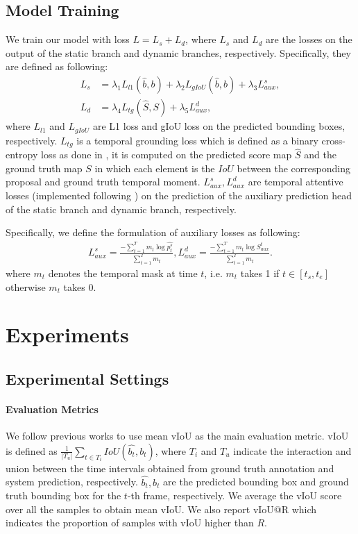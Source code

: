 \documentclass[sigconf]{acmart}
\begin{document}
\subsection{Model Training}
We train our model with loss $L=L_{s}+L_{d}$, where $L_s$ and $L_d$ are the losses on the output of the static branch and dynamic branches, respectively. Specifically, they are defined as following:
\begin{align}
 L_s &= \lambda_1 L_{l1}(\hat{b}, b)+\lambda_2 L_{gIoU}(\hat{b}, b) + \lambda_3 L_{aux}^{s},\\
 L_d &= \lambda_4 L_{tg}(\hat{S}, S)+ \lambda_5 L_{aux}^{d},
\end{align}
where $L_{l1}$ and $L_{gIoU}$ are L1 loss and gIoU loss on the predicted bounding boxes, respectively. $L_{tg}$ is a temporal grounding loss which is defined as a binary cross-entropy loss as done in \cite{2dtan, Aug2dTAN}, it is computed on the predicted score map $\hat{S}$ and the ground truth map $S$ in which each element is the $IoU$ between the corresponding proposal and ground truth temporal moment. $L_{aux}^{s}, L_{aux}^{d}$ are temporal attentive losses (implemented following \cite{tem_att_loss}) on the prediction of the auxiliary prediction head of the static branch and dynamic branch, respectively.

Specifically, we define the formulation of auxiliary losses as following:
\begin{align}
L_{aux}^{s} = \frac{-\sum_{t=1}^{T}m_t\log\hat{p_t^{s}}}{\sum_{t=1}^{T}m_t}, 
L_{aux}^{d} = \frac{-\sum_{t=1}^{T}m_t\log{S_{aux}^{t}}}{\sum_{t=1}^{T}m_t}.
\end{align}
where $m_t$ denotes the temporal mask at time $t$, i.e. $m_t$ takes 1 if $t\in [t_s, t_e]$ otherwise $m_t$ takes 0.

\section{Experiments}
\label{exp:all}
\subsection{Experimental Settings}
\paragraph{Evaluation Metrics}
We follow previous works\cite{Aug2dTAN, where-dose-it-exist, TubeDETR, STVGBert, HCSTVG_paper} to use mean vIoU as the main evaluation metric. vIoU is defined as $\frac{1}{\left|T_u\right|}\sum_{t\in T_i}IoU(\hat{b_t}, b_t)$, where $T_i$ and $T_u$ indicate the interaction and union between the time intervals obtained from ground truth annotation and system prediction, respectively. $\hat{b_t}, b_t$ are the predicted bounding box and ground truth bounding box for the $t$-th frame, respectively. We average the vIoU score over all the samples to obtain mean vIoU. We also report vIoU@R which indicates the proportion of samples with vIoU higher than $R$. 
\end{document}
